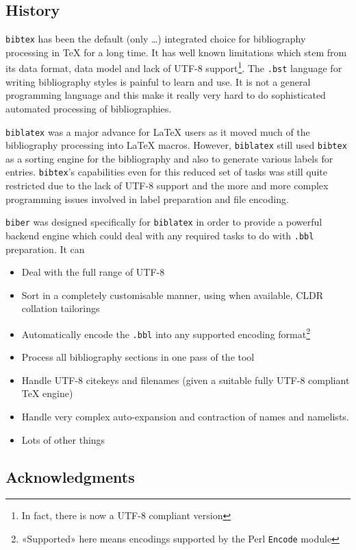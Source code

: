 \documentclass{ltxdockit}
\begin{document}
\subsection{History}

\verb+bibtex+ has been the default (only \ldots) integrated choice for
bibliography processing in TeX for a long time. It has well known
limitations which stem from its data format, data model and lack of UTF-8
support\footnote{In fact, there is now a UTF-8 compliant version}. The
\verb+.bst+ language for writing bibliography styles is painful to learn
and use. It is not a general programming language and this make it really
very hard to do sophisticated automated processing of bibliographies.

\verb+biblatex+ was a major advance for LaTeX users as it moved much
of the bibliography processing into LaTeX macros. However,
\verb+biblatex+ still used \verb+bibtex+ as a sorting engine for the
bibliography and also to generate various labels for
entries. \verb+bibtex+'s capabilities even for this reduced set of
tasks was still quite restricted due to the lack of UTF-8 support and
the more and more complex programming issues involved in label
preparation and file encoding.

\verb+biber+ was designed specifically for \verb+biblatex+ in order to
provide a powerful backend engine which could deal with any required
tasks to do with \verb+.bbl+ preparation. It can

\begin{itemize}
\item Deal with the full range of UTF-8
\item Sort in a completely customisable manner, using when available,
  CLDR collation tailorings
\item Automatically encode the \verb+.bbl+ into any supported encoding
  format\footnote{«Supported» here means encodings supported by the
    Perl \texttt{Encode} module}
\item Process all bibliography sections in one pass of the tool
\item Handle UTF-8 citekeys and filenames (given a suitable fully
  UTF-8 compliant TeX engine)
\item Handle very complex auto-expansion and contraction of names and
  namelists.
\item Lots of other things
\end{itemize}

\subsection{Acknowledgments}
\end{document}
